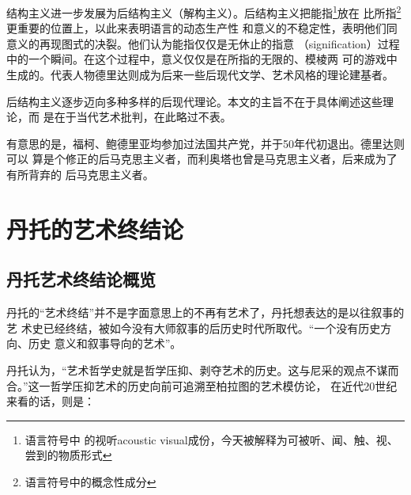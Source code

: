 结构主义进一步发展为后结构主义（解构主义）。后结构主义把能指\footnote{语言符号中
  的视听acoustic visual成份，今天被解释为可被听、闻、触、视、尝到的物质形式}放在
比所指\footnote{语言符号中的概念性成分}更重要的位置上，以此来表明语言的动态生产性
和意义的不稳定性，表明他们同意义的再现图式的决裂。他们认为能指仅仅是无休止的指意
（signification）过程中的一个瞬间。在这个过程中，意义仅仅是在所指的无限的、模棱两
可的游戏中生成的。代表人物德里达则成为后来一些后现代文学、艺术风格的理论建基者。

后结构主义逐步迈向多种多样的后现代理论。本文的主旨不在于具体阐述这些理论，而
是在于当代艺术批判，在此略过不表。

有意思的是，福柯、鲍德里亚均参加过法国共产党，并于50年代初退出。德里达则可以
算是个修正的后马克思主义者，而利奥塔也曾是马克思主义者，后来成为了有所背弃的
后马克思主义者。

\section{丹托的艺术终结论}

\subsection{丹托艺术终结论概览}

丹托的“艺术终结”并不是字面意思上的不再有艺术了，丹托想表达的是以往叙事的艺
术史已经终结，被如今没有大师叙事的后历史时代所取代。“一个没有历史方向、历史
意义和叙事导向的艺术”。

丹托认为，“艺术哲学史就是哲学压抑、剥夺艺术的历史。这与尼采的观点不谋而
合。”\cite{dantuozhenduan}这一哲学压抑艺术的历史向前可追溯至柏拉图的艺术模仿论，
在近代20世纪来看的话，则是：

